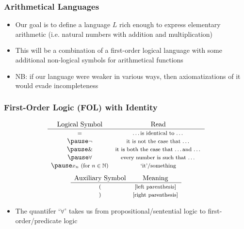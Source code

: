 \begin{frame}
\frametitle{Arithmetical Languages}

\begin{itemize}[<+->]

\item Our goal is to define a language $L$ rich enough to express elementary arithmetic (i.e. natural numbers with addition and multiplication)

\item This will be a combination of a first-order logical language with some additional non-logical symbols for arithmetical functions 

\item NB: if our language were weaker in various ways, then axiomatizations of it would evade incompleteness 

\end{itemize}
\end{frame}

\begin{frame}
\frametitle{First-Order Logic (FOL) with Identity}



\[
\begin{array}{cc}\label{gloss:logica-symb}
 \text{{Logical Symbol}}  &\text{{Read}}   \\
\hline
  \text{\footnotesize $=$}  & \text{\footnotesize  \dots is identical to \dots}  \\ \pause
 \text{\footnotesize $\neg$} & \text{\footnotesize  it is not the case that \dots}  \\ \pause
\text{\footnotesize $\&$}  & \text{\footnotesize  it is both the case that \dots and \dots}  \\ \pause
\text{\footnotesize $\forall$} & \text{\footnotesize  every number is such that \dots} \\ \pause
\text{\footnotesize $x_n$ (for $n \in \mathbb{N}$)} & \text{\footnotesize `it'/something} 
\end{array}
\]
\pause
\[
\begin{array}{cc}
 \text{{Auxiliary Symbol}} & \text{{Meaning}}  \\
\hline
 \text{\footnotesize $($} &\text{\footnotesize [left parenthesis]}\\   
  \text{\footnotesize $)$} &\text{\footnotesize [right parenthesis]}
\end{array}
\]
\pause
\begin{itemize}[<+->]

\item The quantifer `$\forall$' takes us from propositional/sentential logic to first-order/predicate logic 
\end{itemize}


\end{frame}

